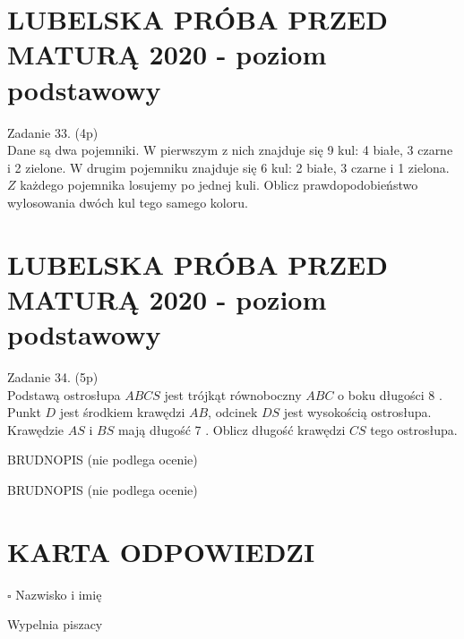 \documentclass[10pt]{article}
\begin{document}
\section*{LUBELSKA PRÓBA PRZED MATURĄ 2020 - poziom podstawowy}
Zadanie 33. (4p)\\
Dane są dwa pojemniki. W pierwszym z nich znajduje się 9 kul: 4 białe, 3 czarne i 2 zielone. W drugim pojemniku znajduje się 6 kul: 2 białe, 3 czarne i 1 zielona. \(Z\) każdego pojemnika losujemy po jednej kuli. Oblicz prawdopodobieństwo wylosowania dwóch kul tego samego koloru.

\section*{LUBELSKA PRÓBA PRZED MATURĄ 2020 - poziom podstawowy}
Zadanie 34. (5p)\\
Podstawą ostrosłupa \(A B C S\) jest trójkąt równoboczny \(A B C\) o boku długości 8 . Punkt \(D\) jest środkiem krawędzi \(A B\), odcinek \(D S\) jest wysokością ostrosłupa. Krawędzie \(A S\) i \(B S\) mają długość 7 . Oblicz długość krawędzi \(C S\) tego ostrosłupa.

BRUDNOPIS (nie podlega ocenie)

BRUDNOPIS (nie podlega ocenie)

\section*{KARTA ODPOWIEDZI}
\(\square\) Nazwisko i imię

Wypelnia piszacy
\end{document}
